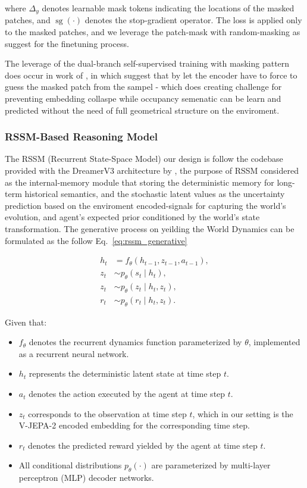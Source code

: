 where $\Delta_y$ denotes learnable mask tokens indicating the locations of the masked patches,
and $\operatorname{sg}(\cdot)$ denotes the stop-gradient operator.
The loss is applied only to the masked patches, and we leverage the patch-mask with random-masking as \cite{mo_2024_connecting} suggest for the finetuning process.

The leverage of the dual-branch self-supervised training with masking pattern does occur in work of \cite{zhu_2025_selfsupervised}, in which suggest that by let the encoder have to force to guess the masked patch from the sampel - which does creating challenge for preventing embedding collaspe while occupancy semenatic can be learn and predicted without the need of full geometrical structure on the enviroment.

\subsubsection*{RSSM-Based Reasoning Model}

The RSSM (Recurrent State-Space Model) our design is follow the codebase provided with the DreamerV3 architecture by \cite{hafner_2019_learning, Hafner2023}, the purpose of RSSM considered as the internal-memory module that storing the deterministic memory for long-term historical semantics, and the stochastic latent values as the uncertainty prediction based on the enviroment encoded-signals for capturing the world's evolution, and agent's expected prior conditioned by the world's state transformation. The generative process on yeilding the World Dynamics can be formulated as the follow Eq.~\eqref{eq:rssm_generative}

\begin{equation}
\label{eq:rssm_generative}
\begin{aligned}
h_t &= f_\theta(h_{t-1}, z_{t-1}, a_{t-1}), \\
z_t &\sim p_\theta(s_t \mid h_t), \\
z_t &\sim p_\theta(z_t \mid h_t, z_t), \\
r_t &\sim p_\theta(r_t \mid h_t, z_t).
\end{aligned}
\end{equation}

Given that:
\begin{itemize}
    \item $f_\theta$ denotes the recurrent dynamics function parameterized by $\theta$,
    implemented as a recurrent neural network.
    \item $h_t$ represents the deterministic latent state at time step $t$.
    \item $a_t$ denotes the action executed by the agent at time step $t$.
    \item $z_t$ corresponds to the observation at time step $t$, which in our setting
    is the V-JEPA-2 encoded embedding for the corresponding time step.
    \item $r_t$ denotes the predicted reward yielded by the agent at time step $t$.
    \item All conditional distributions $p_\theta(\cdot)$ are parameterized by
    multi-layer perceptron (MLP) decoder networks.
\end{itemize}

